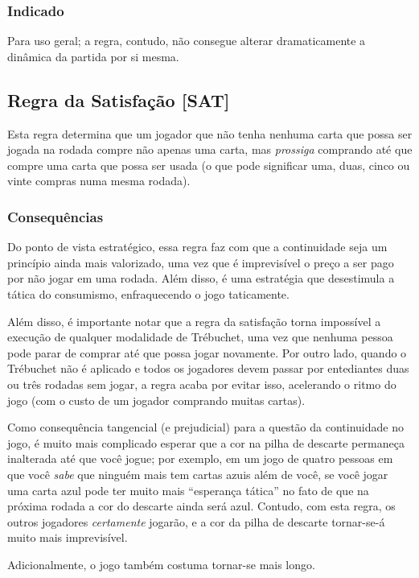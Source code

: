 \subsubsection{Indicado} 

Para uso geral; a regra, contudo, não consegue alterar dramaticamente a dinâmica da partida por si mesma.

\subsection{Regra da Satisfação [SAT]}

Esta regra determina que um jogador que não tenha nenhuma carta que possa ser jogada na rodada compre não apenas uma carta, mas \emph{prossiga} comprando até que compre uma carta que possa ser usada (o que pode significar uma, duas, cinco ou vinte compras numa mesma rodada).

\subsubsection{Consequências}

Do ponto de vista estratégico, essa regra faz com que a continuidade seja um princípio ainda mais valorizado, uma vez que é imprevisível o preço a ser pago por não jogar em uma rodada. Além disso, é uma estratégia que desestimula a tática do consumismo, enfraquecendo o jogo taticamente.

Além disso, é importante notar que a regra da satisfação torna impossível a execução de qualquer modalidade de Trébuchet, uma vez que nenhuma pessoa pode parar de comprar até que possa jogar novamente. Por outro lado, quando o Trébuchet não é aplicado e todos os jogadores devem passar por entediantes duas ou três rodadas sem jogar, a regra acaba por evitar isso, acelerando o ritmo do jogo (com o custo de um jogador comprando muitas cartas).

Como consequência tangencial (e prejudicial) para a questão da continuidade no jogo, é muito mais complicado esperar que a cor na pilha de descarte permaneça inalterada até que você jogue; por exemplo, em um jogo de quatro pessoas em que você \emph{sabe} que ninguém mais tem cartas azuis além de você, se você jogar uma carta azul pode ter muito mais ``esperança tática'' no fato de que na próxima rodada a cor do descarte ainda será azul. Contudo, com esta regra, os outros jogadores \emph{certamente} jogarão, e a cor da pilha de descarte tornar-se-á muito mais imprevisível.

Adicionalmente, o jogo também costuma tornar-se mais longo.

